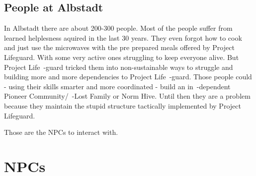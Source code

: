 \subsection{People at Albstadt}

In Albstadt there are about 200-300 people. Most of the people suffer from learned helplesness aquired in the last 30 years. They even forgot how to cook and just use the microwaves with the pre prepared meals offered by Project Lifeguard. With some very active ones struggling to keep everyone alive. But Project Life~-guard tricked them into non-sustainable ways to struggle and building more and more dependencies to Project Life~-guard. Those people could - using their skills smarter and more coordinated - build an in~-dependent Pioneer Community/~-Lost Family or Norm Hive. Until then they are a problem because they maintain the stupid structure tactically implemented by Project Lifeguard.

Those are the NPCs to interact with.

\section{NPCs}

\newpage

